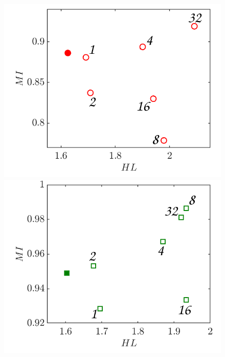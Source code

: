 \documentclass[%
aip,
amsmath,amssymb,
reprint,
]{revtex4-1}
\begin{document}
			\vspace{0.45cm} 
			\begin{figure}
				\begin{center}
					\begin{minipage}[c]{0.3\linewidth}
						\includegraphics[width=1\linewidth,trim=0.5cm 0cm 0cm 0cm,clip]{Figures/MI_8h_HL_1.png}
					\end{minipage}
					\begin{minipage}[c]{0.3\linewidth}
						\includegraphics[width=1\linewidth,trim=0.5cm 0cm 0cm 0cm,clip]{Figures/MI_8h_HL_2.png}
					\end{minipage}

\end{center}
\end{figure}
\end{document}
